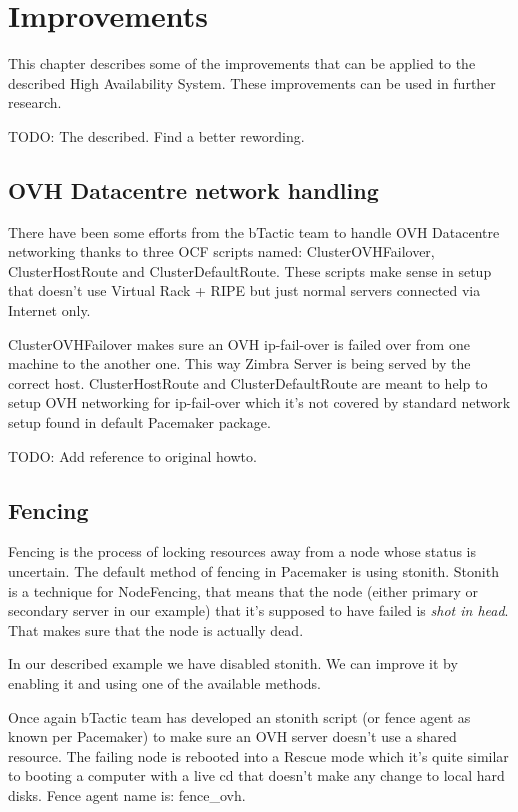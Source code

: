 

\chapter{Improvements}
This chapter describes some of the improvements that can be applied to the described High Availability System. These improvements can be used in further research.

TODO: The described. Find a better rewording.

\section {OVH Datacentre network handling}
There have been some efforts from the bTactic team to handle OVH Datacentre networking thanks to three OCF scripts named: 
ClusterOVHFailover, ClusterHostRoute and ClusterDefaultRoute. These scripts make sense in setup that doesn't use Virtual Rack + RIPE but just normal servers connected via Internet only.

ClusterOVHFailover makes sure an OVH ip-fail-over is failed over from one machine to the another one. This way Zimbra Server is being served by the correct host.
ClusterHostRoute and ClusterDefaultRoute are meant to help to setup OVH networking for ip-fail-over which it's not covered by standard network setup found in  default Pacemaker package.

TODO: Add reference to original howto.

\section {Fencing}
Fencing is the process of locking resources away from a node whose status is uncertain. The default method of fencing in Pacemaker is using stonith. Stonith is a technique for NodeFencing, that means that the node (either primary or secondary server in our example) that it's supposed to have failed is \textit{shot in head}. That makes sure that the node is actually dead.

In our described example we have disabled stonith. We can improve it by enabling it and using one of the available methods.

Once again bTactic team has developed an stonith script (or fence agent as known per Pacemaker) to make sure an OVH server doesn't use a shared resource. The failing node is rebooted into a Rescue mode which it's quite similar to booting a computer with a live cd that doesn't make any change to local hard disks. Fence agent name is: fence\_ovh.

